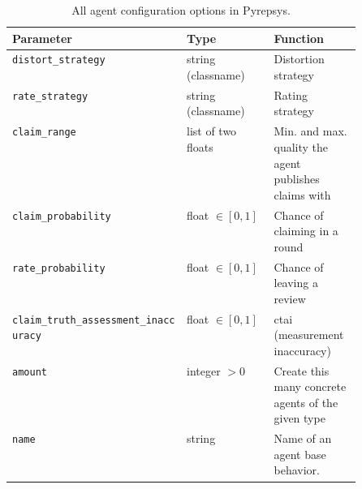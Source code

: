 \documentclass[%
    ]{\PathToTumTemplate/thesis/tum_thesis}
\begin{document}
\begin{appendix}
\begin{table}[p]
\centering
\begin{tabular}{@{}lp{0.25\linewidth}p{0.25\linewidth}@{}}
\toprule
\textbf{Parameter} & \textbf{Type} & \textbf{Function}    \\ \midrule
\texttt{distort\_strategy} & string \mbox{(classname)} & Distortion strategy \\
\texttt{rate\_strategy} & string \mbox{(classname)} & Rating strategy \\
\texttt{claim\_range} & list of two floats & Min. and max. quality the agent publishes claims with  \\
\texttt{claim\_probability} & float $\in [0,1]$ & Chance of claiming in a round \\
\texttt{rate\_probability} & float $\in [0,1]$ & Chance of leaving a review \\
\texttt{claim\_truth\_assessment\_inaccuracy} & float $\in [0,1]$ & \gls{ctai} (measurement inaccuracy) \\
\texttt{amount} & integer $>0$& Create this many concrete agents of the given type \\
\texttt{name} & string & Name of an agent base behavior. \\

\bottomrule
\end{tabular}
\caption{
	All agent configuration options in Pyrepsys.
}
\label{tab:all_agent_options}
\end{table}









\end{appendix}
\end{document}
